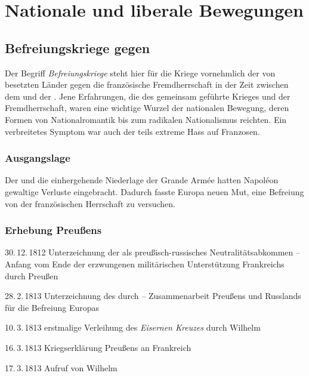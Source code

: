 \section[Nationale und liberale Bewegungen]{Nationale und liberale
Bewegungen}
\label{sec:nat-lib-bew}

\subsection{Befreiungskriege gegen }

Der Begriff \emph{Befreiungskriege} steht hier für die Kriege
vornehmlich der von  besetzten Länder gegen die
französische Fremdherrschaft in der Zeit zwischen dem  und der . Jene Erfahrungen, die des gemeinsam geführte Krieges
und der Fremdherrschaft, waren eine wichtige Wurzel der
nationalen Bewegung, deren Formen von Nationalromantik bis zum
radikalen Nationalismus reichten. Ein verbreitetes Symptom war auch
der teils extreme Hass auf Franzosen.


\subsubsection{Ausgangslage}

Der  und die
einhergehende Niederlage der Grande Arm\'ee hatten  Napol\'eon
gewaltige Verluste eingebracht.  Dadurch fasste Europa neuen Mut, eine
Befreiung von der französischen Herrschaft zu versuchen.


\subsubsection{Erhebung Preußens}

\begin{chronik}
\item[30.\,12.\,1812]
Unterzeichnung der  als
preußisch-russisches Neutralitätsabkommen -- Anfang vom Ende der
erzwungenen militärischen Unterstützung Frankreichs durch Preußen

\item[28.\,2.\,1813]
Unterzeichnung des 
durch  -- Zusammenarbeit Preußens und Russlands
für die Befreiung Europas

\item[10.\,3.\,1813]
erstmalige Verleihung des \emph{Eisernen Kreuzes}  durch Wilhelm 

\item[16.\,3.\,1813]
Kriegserklärung Preußens an Frankreich

\item[17.\,3.\,1813]
Aufruf  von Wilhelm 
\end{chronik}


